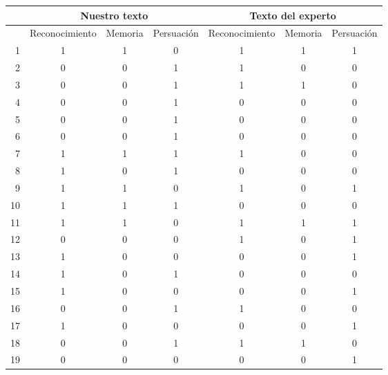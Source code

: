 \begin{table}
  \centering
  \tiny
\begin{tabular}{|r|c|c|c|c|c|c|}
   & \multicolumn{3}{c|}{Nuestro texto}     & \multicolumn{3}{c|}{Texto del experto}   \\\hline
   & Reconocimiento & Memoria & Persuación & Reconocimiento & Memoria & Persuación \\\hline \hline

1 &         1 &         1 &         0 &         1 &         1 &         1 \\
2 &         0 &         0 &         1 &         1 &         0 &         0 \\
3 &         0 &         0 &         1 &         1 &         1 &         0 \\
4 &         0 &         0 &         1 &         0 &         0 &         0 \\
5 &         0 &         0 &         1 &         0 &         0 &         0 \\
6 &         0 &         0 &         1 &         0 &         0 &         0 \\
7 &         1 &         1 &         1 &         1 &         0 &         0 \\
8 &         1 &         0 &         1 &         0 &         0 &         0 \\
9 &         1 &         1 &         0 &         1 &         0 &         1 \\
10 &         1 &         1 &         1 &         0 &         0 &         0 \\
11 &         1 &         1 &         0 &         1 &         1 &         1 \\
12 &         0 &         0 &         0 &         1 &         0 &         1 \\
13 &         1 &         0 &         0 &         0 &         0 &         1 \\
14 &         1 &         0 &         1 &         0 &         0 &         0 \\
15 &         1 &         0 &         0 &         0 &         0 &         1 \\
16 &         0 &         0 &         1 &         1 &         0 &         0 \\
17 &         1 &         0 &         0 &         0 &         0 &         1 \\
18 &         0 &         0 &         1 &         1 &         1 &         0 \\
19 &         0 &         0 &         0 &         0 &         0 &         1 \\

\end{tabular}
\end{table}
